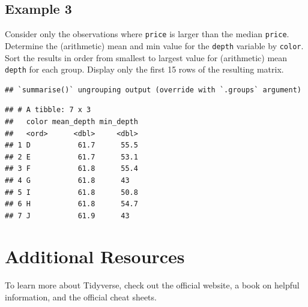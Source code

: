 \documentclass[
]{book}
\newenvironment{Shaded}{\begin{snugshade}}{\end{snugshade}}
\newcommand{\DataTypeTok}[1]{\textcolor[rgb]{0.13,0.29,0.53}{#1}}
\newcommand{\DecValTok}[1]{\textcolor[rgb]{0.00,0.00,0.81}{#1}}
\newcommand{\KeywordTok}[1]{\textcolor[rgb]{0.13,0.29,0.53}{\textbf{#1}}}
\newcommand{\NormalTok}[1]{#1}
\newcommand{\OperatorTok}[1]{\textcolor[rgb]{0.81,0.36,0.00}{\textbf{#1}}}
\newcommand{\StringTok}[1]{\textcolor[rgb]{0.31,0.60,0.02}{#1}}
\begin{document}
\hypertarget{example-3}{%
\subsection{Example 3}\label{example-3}}

Consider only the observations where \texttt{price} is larger than the median \texttt{price}. Determine the (arithmetic) mean and min value for the \texttt{depth} variable by \texttt{color}. Sort the results in order from smallest to largest value for (arithmetic) mean \texttt{depth} for each group. Display only the first 15 rows of the resulting matrix.

\begin{Shaded}
\end{Shaded}

\begin{verbatim}
## `summarise()` ungrouping output (override with `.groups` argument)
\end{verbatim}

\begin{verbatim}
## # A tibble: 7 x 3
##   color mean_depth min_depth
##   <ord>      <dbl>     <dbl>
## 1 D           61.7      55.5
## 2 E           61.7      53.1
## 3 F           61.8      55.4
## 4 G           61.8      43  
## 5 I           61.8      50.8
## 6 H           61.8      54.7
## 7 J           61.9      43
\end{verbatim}

\hypertarget{additional-resources-6}{%
\section*{Additional Resources}\label{additional-resources-6}}

To learn more about Tidyverse, check out the official website, a book on helpful information, and the official cheat sheets.
\end{document}
